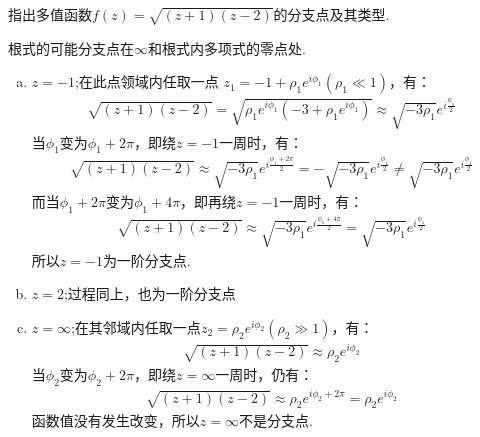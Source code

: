         \begin{example}
            \label{ex:riemann_surface}
            指出多值函数$f(z) = \sqrt{(z + 1)(z - 2)}$的分支点及其类型.
        \end{example}
        \begin{solution}
            根式的可能分支点在$\infty$和根式内多项式的零点处.
            \begin{enumerate}[(a)]
                \item $z = -1$;在此点领域内任取一点 $z_1 = -1 + \rho_1 e^{i \phi_1}(\rho_1 \ll 1)$，有：
                    \begin{align*}
                        \sqrt{(z + 1)(z - 2)} = \sqrt{\rho_1 e^{i \phi_1}(-3 + \rho_1 e^{i \phi_1})} 
                        \approx \sqrt{-3 \rho_1}e^{i\frac{\phi_1}{2}}
                    \end{align*}
                    当$\phi_1$变为$\phi_1 + 2\pi$，即绕$z = -1$一周时，有：
                    \begin{align*}
                        \sqrt{(z + 1)(z - 2)} \approx \sqrt{-3 \rho_1}e^{i\frac{\phi_1 + 2\pi}{2}}
                        = -\sqrt{-3 \rho_1}e^{i\frac{\phi_1}{2}}
                        \neq \sqrt{-3 \rho_1}e^{i\frac{\phi_1}{2}}
                    \end{align*}
                    而当$\phi_1 + 2\pi$变为$\phi_1 + 4\pi$，即再绕$z = -1$一周时，有：
                    \begin{align*}
                        \sqrt{(z + 1)(z - 2)} \approx \sqrt{-3 \rho_1}e^{i\frac{\phi_1 + 4\pi}{2}}
                        = \sqrt{-3 \rho_1}e^{i\frac{\phi_1}{2}}
                    \end{align*}
                    所以$z = -1$为一阶分支点.
                \item $z = 2$;过程同上，也为一阶分支点
                \item $z = \infty$;在其邻域内任取一点$z_2 = \rho_2 e^{i \phi_2}(\rho_2 \gg 1)$，有：
                    \begin{align*}
                        \sqrt{(z + 1)(z - 2)} \approx \rho_2 e^{i\phi_2}
                    \end{align*}
                    当$\phi_2$变为$\phi_2 + 2\pi$，即绕$z = \infty$一周时，仍有：
                    \begin{align*}
                        \sqrt{(z + 1)(z - 2)} \approx \rho_2 e^{i\phi_2 + 2\pi}
                        = \rho_2 e^{i\phi_2}
                    \end{align*}
                    函数值没有发生改变，所以$z = \infty$不是分支点.
            \end{enumerate}
        \end{solution}

